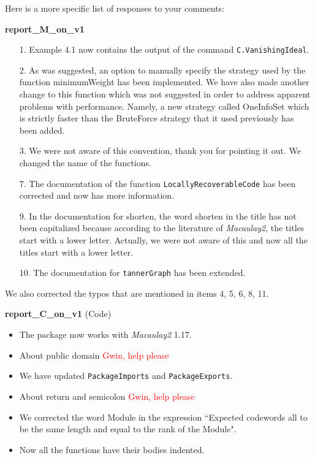 \documentclass[12pt]{amsart}
\theoremstyle{plain}
\begin{document}
Here is a more specific list of responses to your comments:
\begin{center}
{\bf report\_M\_on\_v1}
\end{center}
\begin{itemize}
\item[\rm 1.] Example 4.1 now contains the output of the command {\tt C.VanishingIdeal}.
\item[\rm 2.] As was suggested, an option to manually specify the strategy used by the function {\ttfamily minimumWeight} has been implemented. We have also made another change to this function which was not suggested in order to address apparent problems with performance. Namely, a new strategy called {\ttfamily OneInfoSet} which is strictly faster than the {\ttfamily BruteForce} strategy that it used previously has been added.
\item[\rm 3.] We were not aware of this convention, thank you for pointing it out. We changed the name of the functions.
\item[\rm 7.] The documentation of the function {\tt LocallyRecoverableCode} has been corrected and now has more information.
\item[\rm 9.] In the documentation for shorten, the word shorten in the title has not been capitalized because according to the literature of {\it Macaulay2}, the titles start with a lower letter. Actually, we were not aware of this and now all the titles start with a lower letter.
\item[\rm 10.] The documentation for {\tt tannerGraph} has been extended.
\end{itemize}
We also corrected the typos that are mentioned in items 4, 5, 6, 8, 11.
\begin{center}
{\bf report\_C\_on\_v1} (Code)
\end{center}
\begin{itemize}
\item The package now works with {\it Macaulay2} 1.17.
\item About public domain \textcolor{red}{Gwin, help please}
\item We have updated {\tt PackageImports} and {\tt PackageExports}.
\item About return and semicolon \textcolor{red}{Gwin, help please}
\item We corrected the word Module in the expression ``Expected codewords all to be the same length and equal to the rank of the Module".
\item Now all the functions have their bodies indented.
\end{itemize}
\end{document}
